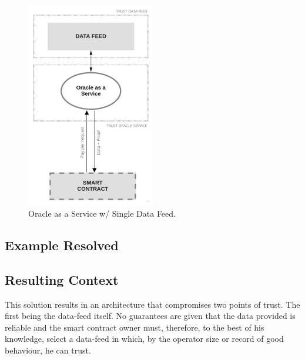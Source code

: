 \begin{figure}[t]
  \begin{center}
    \leavevmode
    \includegraphics[width=0.5\textwidth]{figures/oraclearch1.jpg}
    \caption{Oracle as a Service w/ Single Data Feed.}
    \label{fig:/figures/OaaSwSingleDataFeed}
  \end{center}
\end{figure}

\subsection{Example Resolved}


\subsection{Resulting Context}

This solution results in an architecture that compromises two points of trust. The first being the data-feed itself. No guarantees are given that the data provided is reliable and the smart contract owner must, therefore, to the best of his knowledge, select a data-feed in which, by the operator size or record of good behaviour, he can trust.


